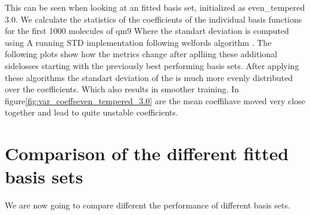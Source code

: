 This can be seen when looking at an fitted basis set, initialized as even_tempered 3.0. We calculate the statistics of the coefficients of the individual basis functions for the first 1000 molecules of qm9
 Where the standart deviation is computed using A running STD implementation following welfords algorithm \cite{Welford}. 
 The following plots show how the metrics change after aplliing these additional sidelosses starting with the previously best performing basis sets.
 After applying these algorithms the standart deviation of the is much more evenly distributed over the coefficients. 
 Which also results in smoother training.
In figure\ref{fig:var_coeffseven_tempered_3.0} are the mean coeffihave moved very close together and lead to quite unstable coefficients.

\section{Comparison of the different fitted basis sets}
We are now going to compare different the performance of different basis sets.
